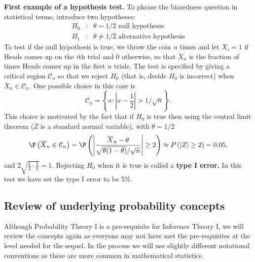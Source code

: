 \textbf{First example of a hypothesis test.} To phrase the biasedness
question in statistical terms, introduce two hypotheses: 
\begin{eqnarray*}
H_{0} &:&\theta=1/2\text{ null hypothesis} \\
H_{1} &:&\theta\neq 1/2\text{ alternative hypothesis}
\end{eqnarray*}%
To test if the null hypothesis 
 is true, we throw the coin $n$ times and let $%
X_{i}=1 $ if Heads comes up on the $i$th trial and $0$ otherwise, so that $%
\overline{X}_{n}$ is the fraction of times Heads comes up in the first $n$
trials. The test is specified by giving a critical region \textbf{%
 }$\mathcal{C}_{n}$ so that we reject $H_{0}$ (that
is, decide $H_{0}$ is incorrect) when $%
\overline{X}_{n}\in \mathcal{C}_{n}$. One possible choice in this case is 
\begin{equation*}
\mathcal{C}_{n}=\left\{ x:\left\vert x-\frac{1}{2}\right\vert >1/\sqrt{n}%
\right\} .
\end{equation*}%
This choice is motivated by the fact that if $H_{0}$ is true then using the
central limit theorem ($Z$ is a standard normal variable), with $\theta=1/2$ 
\begin{equation}
\P \left( \overline{X}_{n}\in \mathcal{C}_{n}\right) =\P \left( \left\vert 
\frac{\overline{X}_{n}-\theta}{\sqrt{\theta(1-\theta)}/\sqrt{n}}\right\vert \geq 2\right)
\approx P\left( \left\vert Z\right\vert \geq 2\right) =0.05.
\end{equation}%
and $2\sqrt{\frac{1}{2}\cdot \frac{1}{2}}=1$. Rejecting $H_{0}$ when it is
true is called a \textbf{type I error. 
}In this test we have set the type I error to be 5\%.

\bigskip \bigskip

\subsection{Review of underlying probability concepts}\label{S:ReviewOfProb}

Although Probability Theory I is a pre-requisite for Inference Theory I, we will review the concepts again as everyone may not have met the pre-requisites at the level needed for the sequel. 
In the process we will use slightly different notational conventions as these are more common in mathematical statistics.


